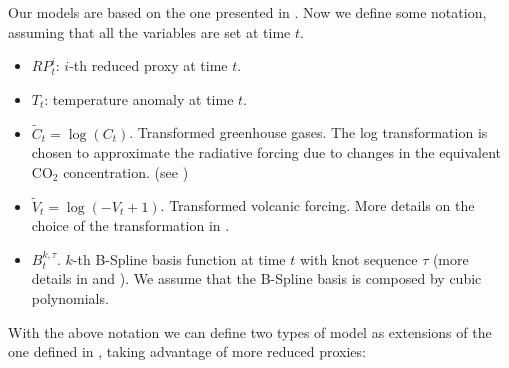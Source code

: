 \documentclass[11pt]{amsart}
\theoremstyle{plain}
\theoremstyle{definition}
\theoremstyle{remark}
\begin{document}
Our models are based on the one presented in \cite{Barboza2014}. Now we define
some notation, assuming that all the variables are set at time $t$.
\begin{itemize}
\item $RP_t^i$: $i$-th reduced proxy at time $t$.
  
\item $T_t$: temperature anomaly at time $t$.
  
\item $\tilde C_t = \log (C_t)$. Transformed greenhouse gases. The log
  transformation is chosen to approximate the radiative forcing due to changes
  in the equivalent CO$_2$ concentration. (see \cite{Barboza2014})
  
\item $\tilde V_t = \log (-V_t+1)$. Transformed volcanic forcing. More details
  on the choice of the transformation in \cite{Barboza2014}.
  
\item $B_t^{k,\tau}$. $k$-th B-Spline basis function at time $t$ with knot
  sequence $\tau$ (more details in \cite{DeBoor2001} and \cite{Ramsay2005}). We assume that the
  B-Spline basis is composed by cubic polynomials.  
\end{itemize}
With the above notation we can define two types of model as extensions of the
one defined in \cite{Barboza2014}, taking advantage of more reduced proxies:
\end{document}
